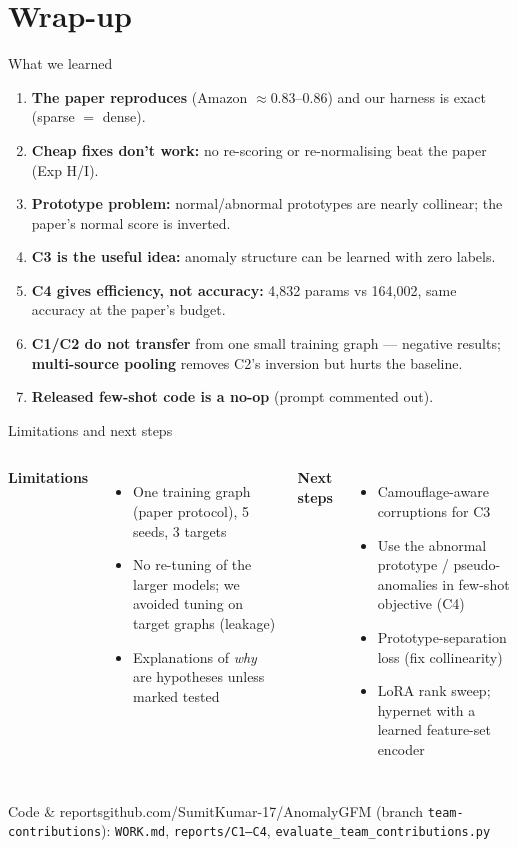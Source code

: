 \documentclass[aspectratio=169,11pt]{beamer}
\begin{document}
\section{Wrap-up}
\begin{frame}{What we learned}
\begin{enumerate}
\item \textbf{The paper reproduces} (Amazon $\approx0.83$--$0.86$) and our harness is exact (sparse $=$ dense).
\item \textbf{Cheap fixes don't work:} no re-scoring or re-normalising beat the paper (Exp H/I).
\item \textbf{Prototype problem:} normal/abnormal prototypes are nearly collinear; the paper's normal score is inverted.
\item \textbf{C3 is the useful idea:} anomaly structure can be learned with \alert{zero labels}.
\item \textbf{C4 gives efficiency, not accuracy:} 4,832 params vs 164,002, same accuracy at the paper's budget.
\item \textbf{C1/C2 do not transfer} from one small training graph --- negative results; \textbf{multi-source pooling} removes C2's inversion but hurts the baseline.
\item \textbf{Released few-shot code is a no-op} (prompt commented out).
\end{enumerate}
\end{frame}

\begin{frame}{Limitations and next steps}
\begin{columns}[T]
\textbf{Limitations}
\begin{itemize}\small
\item One training graph (paper protocol), 5 seeds, 3 targets
\item No re-tuning of the larger models; we avoided tuning on target graphs (leakage)
\item Explanations of \emph{why} are hypotheses unless marked tested
\end{itemize}
\textbf{Next steps}
\begin{itemize}\small
\item Camouflage-aware corruptions for C3
\item Use the abnormal prototype / pseudo-anomalies in few-shot objective (C4)
\item Prototype-separation loss (fix collinearity)
\item LoRA rank sweep; hypernet with a learned feature-set encoder
\end{itemize}
\end{columns}
\vspace{6pt}
\begin{block}{Code \& reports}\small github.com/SumitKumar-17/AnomalyGFM (branch \texttt{team-contributions}): \texttt{WORK.md}, \texttt{reports/C1--C4}, \texttt{evaluate\_team\_contributions.py}\end{block}
\end{frame}
\end{document}
